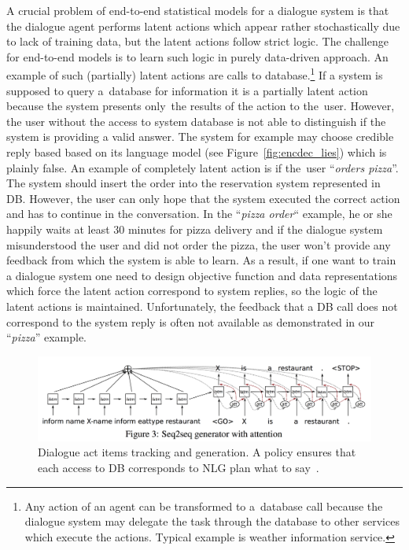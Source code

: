 \documentclass[11pt]{article}
\begin{document}
A crucial problem of end-to-end statistical models for a dialogue system is that the dialogue agent performs latent actions which appear rather stochastically due to lack of training data, but the latent actions follow strict logic.
The challenge for end-to-end models is to learn such logic in purely data-driven approach.
An example of such (partially) latent actions are calls to database.\footnote{Any action of an agent can be transformed to a~database call because the dialogue system may delegate the task through the database to other services which execute the actions. Typical example is weather information service.}
If a system is supposed to query a~database for information it is a partially latent action because the system presents only~the results of the action to the~user.
However, the user without the access to system database is not able to distinguish if the system is providing a valid answer.
The system for example may choose credible reply based based on its language model (see Figure~\ref{fig:encdec_lies}) which is plainly false.
An example of completely latent action is if the~user ``{\it orders pizza}''.
The system should insert the order into the reservation system represented in DB.
However, the user can only hope that the system executed the correct action and has to continue in the conversation. 
In the ``{\it pizza order}`` example, he or she happily waits at least 30 minutes for pizza delivery and if the dialogue system misunderstood the user and did not order the pizza, the user won't provide any feedback from which the system is able to learn.
As a result, if one want to train a dialogue system one need to design objective function and data representations which force the latent action correspond to system replies, so the logic of the latent actions is maintained.
Unfortunately, the feedback that a DB call does not correspond to the system reply is often not available as demonstrated in our ``{\it pizza}'' example.

\begin{figure}[htb]
    \centering
    \includegraphics[width=1.0\linewidth]{dusek_seq2seq}
    \caption{Dialogue act items tracking and generation. A policy ensures that each access to DB corresponds to NLG plan what to say~\cite{dusek_sequence2sequence_2016}.}
\label{fig:dai_gen}
\end{figure}
\end{document}
